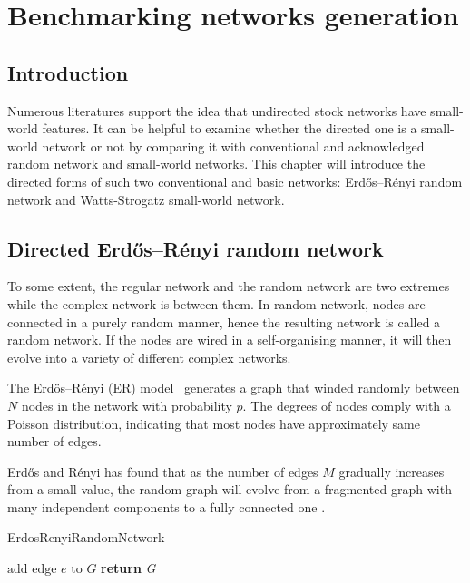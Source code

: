 \chapter{Benchmarking networks generation}
\section{Introduction}
Numerous literatures support the idea that undirected stock networks have small-world features. It can be helpful to examine whether the directed one is a small-world network or not by comparing it with conventional and acknowledged random network and small-world networks. This chapter will introduce the directed forms of such two conventional and basic networks: Erdős–Rényi random network and Watts-Strogatz small-world network.

\section{Directed Erdős–Rényi random network}
To some extent, the regular network and the random network are two extremes while the complex network is between them. In random network, nodes are connected in a purely random manner, hence the resulting network is called a random network. If the nodes are wired in a self-organising manner, it will then evolve into a variety of different complex networks.

The Erdös–Rényi (ER) model~\cite{random} generates a graph that winded randomly between $N$ nodes in the network with probability $p$. The degrees of nodes comply with a Poisson distribution, indicating that most nodes have approximately same number of edges.

Erdős and Rényi has found that as the number of edges $M$ gradually increases from a small value, the random graph will evolve from a fragmented graph with many independent components to a fully connected one \cite{strogatz2001exploring}.

\begin{algorithm}[H]
	\caption{ErdosRenyiRandomNetwork}\label{alg:random}
	\begin{algorithmic}[1]
		 {$\text{add edge }\textit{e}\text{ to }\textit{G}$}
		\EndIf
		\EndFor
		\State \textbf{return} {\textit{G}}
		\EndProcedure
	\end{algorithmic}
\end{algorithm}

